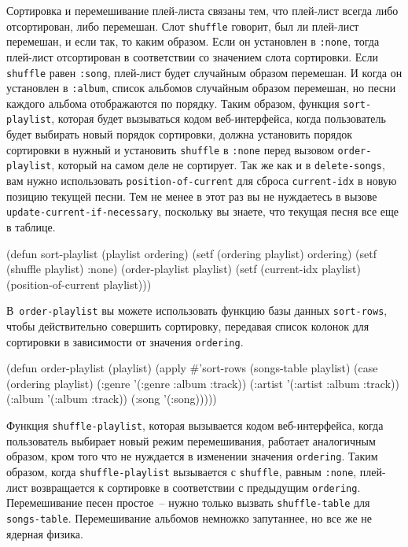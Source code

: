 Сортировка и перемешивание плей-листа связаны тем, что плей-лист всегда либо отсортирован,
либо перемешан. Слот \lstinline{shuffle} говорит, был ли плей-лист перемешан, и если так, то каким
образом. Если он установлен в \lstinline{:none}, тогда плей-лист отсортирован в соответствии со
значением слота сортировки. Если \lstinline{shuffle} равен \lstinline{:song}, плей-лист будет
случайным образом перемешан. И когда он установлен в \lstinline{:album}, список альбомов
случайным образом перемешан, но песни каждого альбома отображаются по порядку. Таким
образом, функция \lstinline{sort-playlist}, которая будет вызываться кодом веб-интерфейса, когда
пользователь будет выбирать новый порядок сортировки, должна установить порядок сортировки
в нужный и установить \lstinline{shuffle} в \lstinline{:none} перед вызовом \lstinline{order-playlist},
который на самом деле не сортирует. Так же как и в \lstinline{delete-songs}, вам нужно
использовать \lstinline{position-of-current} для сброса \lstinline{current-idx} в новую позицию
текущей песни. Тем не менее в этот раз вы не нуждаетесь в вызове
\lstinline{update-current-if-necessary}, поскольку вы знаете, что текущая песня все еще в
таблице.

\begin{myverb}
(defun sort-playlist (playlist ordering)
  (setf (ordering playlist) ordering)
  (setf (shuffle playlist) :none)
  (order-playlist playlist)
  (setf (current-idx playlist) (position-of-current playlist)))
\end{myverb}

В~\lstinline{order-playlist} вы можете использовать функцию базы данных \lstinline{sort-rows}, чтобы
действительно совершить сортировку, передавая список колонок для сортировки в зависимости
от значения \lstinline{ordering}.

\begin{myverb}
(defun order-playlist (playlist)
  (apply #'sort-rows (songs-table playlist)
    (case (ordering playlist)
      (:genre  '(:genre :album :track))
      (:artist '(:artist :album :track))
      (:album  '(:album :track))
      (:song   '(:song)))))
\end{myverb}

Функция \lstinline{shuffle-playlist}, которая вызывается кодом веб-интерфейса, когда
пользователь выбирает новый режим перемешивания, работает аналогичным образом, кром того
что не нуждается в изменении значения \lstinline{ordering}. Таким образом, когда
\lstinline{shuffle-playlist} вызывается с \lstinline{shuffle}, равным \lstinline{:none}, плей-лист
возвращается к сортировке в соответствии с предыдущим \lstinline{ordering}. Перемешивание песен
простое~-- нужно только вызвать \lstinline{shuffle-table} для \lstinline{songs-table}.
Перемешивание альбомов немножко запутаннее, но все же не ядерная физика.

